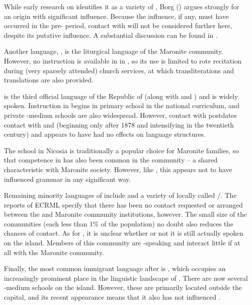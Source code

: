 \documentclass[output=paper]{langsci/langscibook}
\begin{document}
While early research on  identifies it as a  variety of  \citep{Tsiapera1969}, Borg (\citeyear{Borg1985,Borg2004}) argues strongly for an  origin with significant   influence. Because the  influence, if any, must have occurred in the pre- period, contact with  will not be considered further here, despite its putative influence. A substantial discussion can be found in \citet{Borg2004}.

Another  language, , is the liturgical language of the Maronite community. However, no instruction is available in  in , so its use is limited to rote recitation during (very sparsely attended) church services, at which transliterations and  translations are also provided.


 is the third official language of the Republic of  (along with  and ) and is widely spoken. Instruction in  begins in primary school in the national curriculum, and private -medium schools are also widespread. However, contact with  postdates contact with  and  (beginning only after 1878 and intensifying in the twentieth century) and appears to have had no effects on  language structures.

The  school in Nicosia is traditionally a popular choice for Maronite families, so that competence in  has also been common in the community – a shared characteristic with  Maronite society. However, like , this appears not to have influenced  grammar in any significant way.

Remaining minority languages of  include  and a variety of  locally called /. The reports of ECRML specify that there has been no contact requested or arranged between the  and Maronite community institutions, however. The small size of the communities (each less than 1\% of the population) no doubt also reduces the chances of contact. As for , it is unclear whether or not it is still actually spoken on the island. Members of this community are -speaking and interact little if at all with the Maronite community.

Finally, the most common immigrant language after  is , which occupies an increasingly prominent place in the linguistic landscape of . There are now several -medium schools on the island. However, these are primarily located outside the capital, and its recent appearance means that it also has not influenced .
\end{document}
